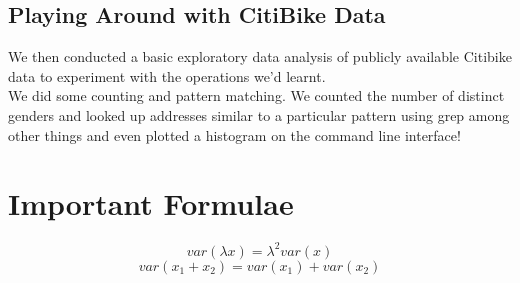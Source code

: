 \subsection{Playing Around with CitiBike Data}
We then conducted a basic exploratory data analysis of publicly available Citibike data to experiment with the operations we'd learnt.\\
We did some counting and pattern matching. We counted the number of distinct genders and looked up addresses similar to a particular pattern using grep among other things and even plotted a histogram on the command line interface!


\section{Important Formulae}
\begin{equation}
  var(\lambda x) = \lambda^2var(x)
\end{equation}
\begin{equation}
  var(x_1 + x_2) = var(x_1) + var(x_2)
\end{equation}















